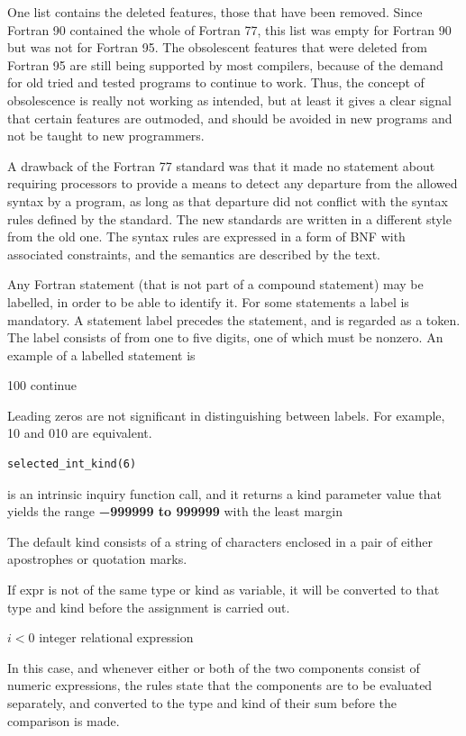 One list contains the deleted features, those that have been removed. Since Fortran 90 contained the whole of Fortran 77, this list was empty for Fortran 90 but was not for Fortran 95. The obsolescent features that were deleted from Fortran 95 are still being supported by most compilers, because of the demand for old tried and tested programs to continue to work. Thus, the concept of obsolescence is really not working as intended, but at least it gives a clear signal that certain features are outmoded, and should be avoided in new programs and not be taught to new programmers.

A drawback of the Fortran 77 standard was that it made no statement about requiring processors to provide a means to detect any departure from the allowed syntax by a program, as long as that departure did not conflict with the syntax rules defined by the standard. The new standards are written in a different style from the old one. The syntax rules are expressed in a form of BNF with associated constraints, and the semantics are described by the text.

Any Fortran statement (that is not part of a compound statement) may be labelled, in order to be able to identify it. For some statements a label is mandatory. A statement label precedes the statement, and is regarded as a token. The label consists of from one to five digits, one of which must be nonzero. An example of a labelled statement is

100 continue

Leading zeros are not significant in distinguishing between labels. For example, 10 and 010 are equivalent.

\begin{verbatim}
selected_int_kind(6) 
\end{verbatim}
is an intrinsic inquiry function call, and it returns a kind parameter value that yields the range \textbf{−999999 to 999999} with the least margin

The default kind consists of a string of characters enclosed in a pair of either apostrophes or quotation marks. 

If expr is not of the same type or kind as variable, it will be converted to that type and kind before the assignment is carried out.

$i <0$ integer relational expression

In this case, and whenever either or both of the two components consist of numeric expressions, the rules state that the components are to be evaluated separately, and converted to the type and kind of their sum before the comparison is made.

